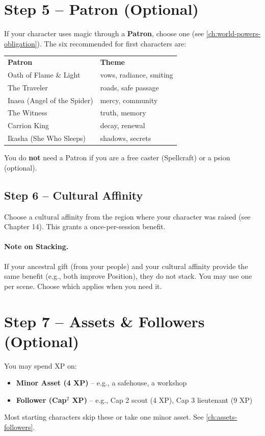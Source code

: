 \section{Step 5 -- Patron (Optional)}
If your character uses magic through a \textbf{Patron}, choose one (see \ref{ch:world-powers-obligation}). The six recommended for first characters are:
\begin{center}
\footnotesize
\begin{tabular}{ll}
\textbf{Patron} & \textbf{Theme} \\
Oath of Flame \& Light & vows, radiance, smiting \\
The Traveler & roads, safe passage \\
Inaea (Angel of the Spider) & mercy, community \\
The Witness & truth, memory \\
Carrion King & decay, renewal \\
Ikasha (She Who Sleeps) & shadows, secrets \\
\end{tabular}
\end{center}
You do \textbf{not} need a Patron if you are a free caster (Spellcraft) or a psion (optional).

\subsection{Step 6 -- Cultural Affinity}
Choose a cultural affinity from the region where your character was raised (see Chapter 14). This grants a once-per-session benefit.

\paragraph{Note on Stacking.}
If your ancestral gift (from your people) and your cultural affinity provide the same benefit (e.g., both improve Position), they do not stack. You may use one per scene. Choose which applies when you need it.

\section{Step 7 -- Assets \& Followers (Optional)}
You may spend XP on:
\begin{itemize}
  \item \textbf{Minor Asset (4 XP)} -- e.g., a safehouse, a workshop
  \item \textbf{Follower (Cap\(^2\) XP)} -- e.g., Cap 2 scout (4 XP), Cap 3 lieutenant (9 XP)
\end{itemize}
Most starting characters skip these or take one minor asset. See \ref{ch:assets-followers}.

